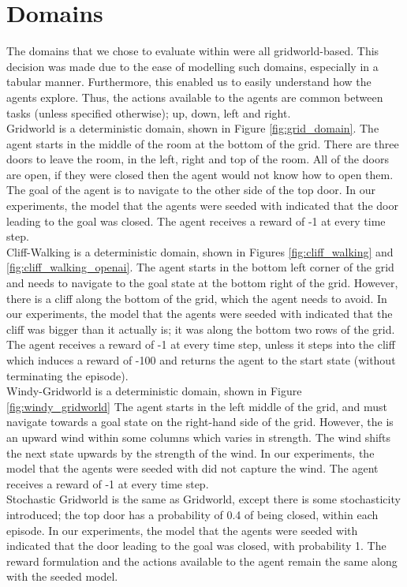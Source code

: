 \section{Domains}
The domains that we chose to evaluate within were all gridworld-based. This decision was made due to the ease of modelling such domains, especially in a tabular manner. Furthermore, this enabled us to easily understand how the agents explore. Thus, the actions available to the agents are common between tasks (unless specified otherwise); up, down, left and right.
\\Gridworld is a deterministic domain, shown in Figure \ref{fig:grid_domain}. The agent starts in the middle of the room at the bottom of the grid. There are three doors to leave the room, in the left, right and top of the room. All of the doors are open, if they were closed then the agent would not know how to open them. The goal of the agent is to navigate to the other side of the top door. In our experiments, the model that the agents were seeded with indicated that the door leading to the goal was closed. The agent receives a reward of -1 at every time step.
\\Cliff-Walking \cite{Sutton1998} is a deterministic domain, shown in Figures \ref{fig:cliff_walking} and \ref{fig:cliff_walking_openai}. The agent starts in the bottom left corner of the grid and needs to navigate to the goal state at the bottom right of the grid. However, there is a cliff along the bottom of the grid, which the agent needs to avoid. In our experiments, the model that the agents were seeded with indicated that the cliff was bigger than it actually is; it was along the bottom two rows of the grid. The agent receives a reward of -1 at every time step, unless it steps into the cliff which induces a reward of -100 and returns the agent to the start state (without terminating the episode).
\\Windy-Gridworld \cite{Sutton1998} is a deterministic domain, shown in Figure \ref{fig:windy_gridworld} The agent starts in the left middle of the grid, and must navigate towards a goal state on the right-hand side of the grid. However, the is an upward wind within some columns which varies in strength. The wind shifts the next state upwards by the strength of the wind. In our experiments, the model that the agents were seeded with did not capture the wind. The agent receives a reward of -1 at every time step.
\\Stochastic Gridworld is the same as Gridworld, except there is some stochasticity introduced; the top door has a probability of 0.4 of being closed, within each episode. In our experiments, the model that the agents were seeded with indicated that the door leading to the goal was closed, with probability 1. The reward formulation and the actions available to the agent remain the same along with the seeded model.
